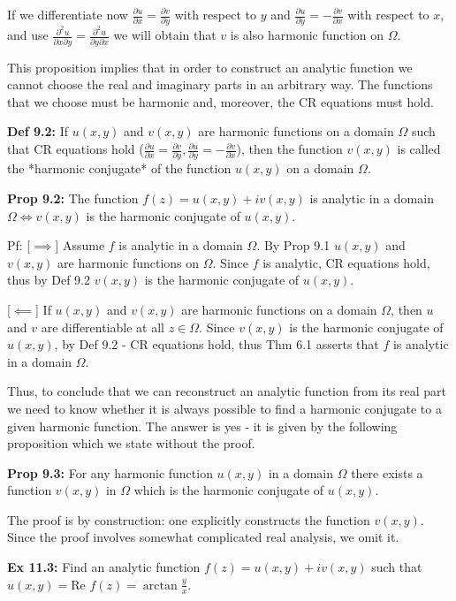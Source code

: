 \documentclass{article}
\begin{document}
If we differentiate now $\frac{\partial u}{\partial x} = \frac{\partial v}{\partial y}$ with respect to $y$ and $\frac{\partial u}{\partial y} = -\frac{\partial v}{\partial x}$ with respect to $x$, and use $\frac{\partial^2 u}{\partial x \partial y} = \frac{\partial^2 u}{\partial y \partial x}$ we will obtain that $v$ is also harmonic function on $\Omega$.

This proposition implies that in order to construct an analytic function we cannot choose the real and imaginary parts in an arbitrary way. The functions that we choose must be harmonic and, moreover, the CR equations must hold.

\textbf{Def 9.2:} If $u(x,y)$ and $v(x,y)$ are harmonic functions on a domain $\Omega$ such that CR equations hold ($\frac{\partial u}{\partial x} = \frac{\partial v}{\partial y}, \frac{\partial u}{\partial y} = -\frac{\partial v}{\partial x}$), then the function $v(x,y)$ is called the *harmonic conjugate* of the function $u(x,y)$ on a domain $\Omega$.

\textbf{Prop 9.2:} The function $f(z) = u(x,y) + iv(x,y)$ is analytic in a domain $\Omega \iff v(x,y)$ is the harmonic conjugate of $u(x,y)$.

Pf: [$\implies$] Assume $f$ is analytic in a domain $\Omega$. By Prop 9.1
$u(x,y)$ and $v(x,y)$ are harmonic functions on $\Omega$. Since $f$ is analytic, CR equations hold, thus by Def 9.2 $v(x,y)$ is the harmonic conjugate of $u(x,y)$.

[$\impliedby$] If $u(x,y)$ and $v(x,y)$ are harmonic functions on a domain $\Omega$, then $u$ and $v$ are differentiable at all $z \in \Omega$. Since $v(x,y)$ is the harmonic conjugate of $u(x,y)$, by Def 9.2 - CR equations hold, thus Thm 6.1 asserts that $f$ is analytic in a domain $\Omega$.

Thus, to conclude that we can reconstruct an analytic function from its real part we need to know whether it is always possible to find a harmonic conjugate to a given harmonic function. The answer is yes - it is given by the following proposition which we state without the proof.

\textbf{Prop 9.3:} For any harmonic function $u(x,y)$ in a domain $\Omega$ there exists a function $v(x,y)$ in $\Omega$ which is the harmonic conjugate of $u(x,y)$.

The proof is by construction: one explicitly constructs the function $v(x,y)$. Since the proof involves somewhat complicated real analysis, we omit it.

\textbf{Ex 11.3:} Find an analytic function $f(z) = u(x,y) + iv(x,y)$ such that $u(x,y) = \text{Re } f(z) = \arctan \frac{y}{x}$.
\end{document}
